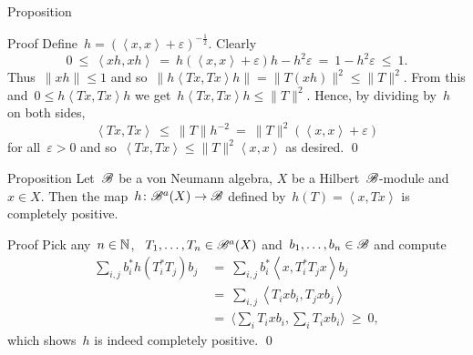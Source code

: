 \begin{parsec}
\begin{point}{Proposition}
\begin{point}{Proof}
Define~$h = (\left<x,x\right> + \varepsilon)^{-\frac{1}{2}}$.
Clearly
\begin{equation*}
0 \ \leq\  \left<xh,xh\right>
    \ =\  h (\left<x,x\right> + \varepsilon)h - h^2 \varepsilon
    \ =\  1 - h^2 \varepsilon \ \leq\  1.
\end{equation*}
Thus~$\|xh\| \leq 1$
and so~$\|h\left<Tx, Tx\right>h\| = \|T(xh)\|^2 \leq \|T\|^2$.
From this and~$0 \leq h\left<Tx,Tx\right>h$
we get~$h\left<Tx,Tx\right>h \leq \|T\|^2$. Hence, by dividing by~$h$
    on both sides,
\begin{equation*}
\left<Tx,Tx\right> \ \leq \ \|T\| h^{-2}\  =
    \  \|T\|^2(\left<x,x\right> + \varepsilon)
\end{equation*}
for all~$\varepsilon > 0$
and so~$\left<Tx,Tx\right> \leq \|T\|^2 \left<x,x\right>$ as desired. \qed
\end{point}
\end{point}
\end{parsec}

\begin{parsec}%
\begin{point}{Proposition}%
Let~$\mathscr{B}$ be a von Neumann algebra,
    $X$ be a Hilbert~$\mathscr{B}$-module
    and~$x \in X$.
Then the map~$h\colon \mathscr{B}^a(X )\to \mathscr{B}$
defined by~$h(T) = \left<x,Tx\right>$
is completely positive.
\begin{point}{Proof}%
Pick any~$n \in \mathbb{N}$, ~$T_1, \ldots, T_n \in \mathscr{B}^a(X)$
    and~$b_1, \ldots, b_n \in \mathscr{B}$
    and compute
\begin{align*}
\sum_{i,j} b_i^* h(T_i^*T_j)b_j
&\ =\ \sum_{i,j} b_i^* \left<x,T_i^*T_j x\right> b_j\\
&\ =\ \sum_{i,j} \left<T_i x b_i,T_j x b_j\right>  \\
&\ =\ \bigl\langle\sum_i T_i x b_i, \sum_i T_i x b_i\bigr\rangle \ \geq\  0,
\end{align*}
which shows~$h$ is indeed completely positive. \qed
\end{point}
\end{point}
\end{parsec}

